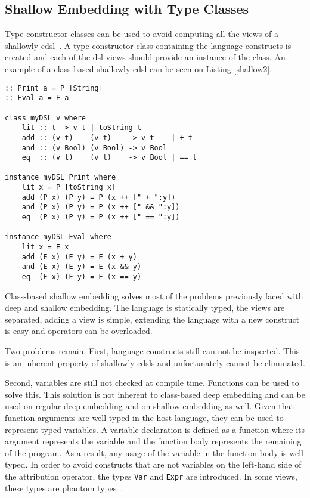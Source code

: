 \subsection{Shallow Embedding with Type Classes}\label{sec:class_based_edsl}

Type constructor classes can be used to avoid computing all the views of a shallowly \ac{edsl}~\cite{tagless}. A type constructor class containing the language constructs is created and each of the \ac{dsl} views should provide an instance of the class. An example of a class-based shallowly \ac{edsl} can be seen on Listing \ref{shallow2}.

\begin{lstlisting}[caption=A simple class-based shallowly \ac{edsl},captionpos=b,label=shallow2]
:: Print a = P [String]
:: Eval a = E a

class myDSL v where
    lit :: t -> v t | toString t
    add :: (v t)    (v t)    -> v t    | + t
    and :: (v Bool) (v Bool) -> v Bool
    eq  :: (v t)    (v t)    -> v Bool | == t
    
instance myDSL Print where
    lit x = P [toString x]
    add (P x) (P y) = P (x ++ [" + ":y])
    and (P x) (P y) = P (x ++ [" && ":y])
    eq  (P x) (P y) = P (x ++ [" == ":y])
    
instance myDSL Eval where
    lit x = E x
    add (E x) (E y) = E (x + y)
    and (E x) (E y) = E (x && y)
    eq  (E x) (E y) = E (x == y)
\end{lstlisting}

Class-based shallow embedding solves most of the problems previously faced with deep and shallow embedding. The language is statically typed, the views are separated, adding a view is simple, extending the language with a new construct is easy and operators can be overloaded. 

Two problems remain. First, language constructs still can not be inspected. This is an inherent property of shallowly \acp{edsl} and unfortunately cannot be eliminated. 

Second, variables are still not checked at compile time. Functions can be used to solve this. This solution is not inherent to class-based deep embedding and can be used on regular deep embedding and on shallow embedding as well. Given that function arguments are well-typed in the host language, they can be used to represent typed variables. A variable declaration is defined as a function where its argument represents the variable and the function body represents the remaining of the program. As a result, any usage of the variable in the function body is well typed. In order to avoid constructs that are not variables on the left-hand side of the attribution operator, the types \texttt{Var} and \texttt{Expr} are introduced. In some views, these types are phantom types~\cite{phantom}. 

